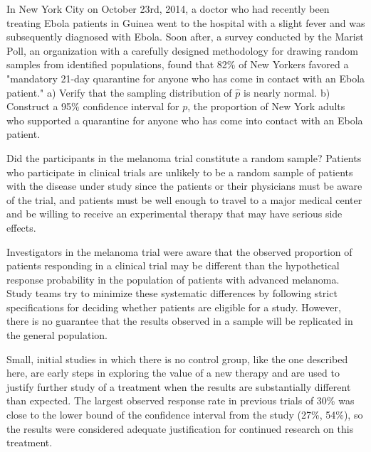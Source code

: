 \textD{\newpage}

\begin{exercisewrap}
\begin{nexercise}
In New York City on October 23rd, 2014, a doctor who had recently been treating Ebola patients in Guinea went to the hospital with a slight fever and was subsequently diagnosed with Ebola. Soon after, a survey conducted by the Marist Poll, an organization with a carefully designed methodology for drawing random samples from identified populations, found that 82\% of New Yorkers favored a "mandatory 21-day quarantine for anyone who has come in contact with an Ebola patient."\footnotemark{} a) Verify that the sampling distribution of $\hat{p}$ is nearly normal. b) Construct a 95\% confidence interval for $p$, the proportion of New York adults who supported a quarantine for anyone who has come into contact with an Ebola patient.\footnotemark{}
\end{nexercise}
\end{exercisewrap}
\addtocounter{footnote}{-1}%
%
\addtocounter{footnote}{1}%

Did the participants in the melanoma trial constitute a random sample?  Patients who participate in clinical trials are unlikely to be a random sample of patients with the disease under study since the patients or their physicians must be aware of the trial, and patients must be well enough to travel to a major medical center and be willing to receive an experimental therapy that may have serious side effects.  

Investigators in the melanoma trial were aware that the observed proportion of patients responding in a clinical trial may be different than the hypothetical response probability in the population of patients with advanced melanoma. Study teams try to minimize these systematic differences by following strict specifications for deciding whether patients are eligible for a study. However, there is no guarantee that the results observed in a sample will be replicated in the general population.

Small, initial studies in which there is no control group, like the one described here, are early steps in exploring the value of a new therapy and are used to justify further study of a treatment when the results are substantially different than expected.  The largest observed response rate in previous trials of 30\% was close to the lower bound of the confidence interval from the study (27\%, 54\%), so the results were considered adequate justification for continued research on this treatment.

